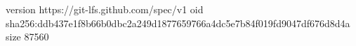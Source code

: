 version https://git-lfs.github.com/spec/v1
oid sha256:ddb437e1f8b66b0dbc2a249d1877659766a4dc5e7b84f019fd9047df676d8d4a
size 87560
